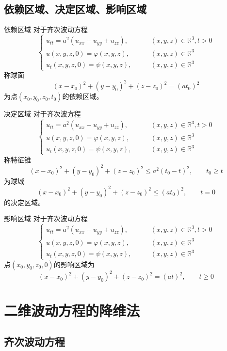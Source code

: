 \documentclass[lang = cn, scheme = chinese, thmcnt = section]{elegantbook}
\newcommand{\R}{\mathbb{R}}            %
\begin{document}
\subsection{依赖区域、决定区域、影响区域}

\begin{definition}{依赖区域}
	对于齐次波动方程
	$$
	\begin{cases}
		u_{tt}=a^2(u_{xx}+u_{yy}+u_{zz}),\qquad & (x,y,z)\in \R^3,t>0\\
		u(x,y,z,0)=\varphi(x,y,z),\qquad & (x,y,z)\in \R^3\\
		u_t(x,y,z,0)=\psi(x,y,z),\qquad & (x,y,z)\in \R^3
	\end{cases}
	$$
	称球面
	$$
	(x-x_0)^2+(y-y_0)^2+(z-z_0)^2=(at_0)^2
	$$
	为点$(x_0,y_0,z_0,t_0)$的依赖区域。
\end{definition}

\begin{definition}{决定区域}
	对于齐次波方程
	$$
	\begin{cases}
		u_{tt}=a^2(u_{xx}+u_{yy}+u_{zz}),\qquad & (x,y,z)\in \R^3,t>0\\
		u(x,y,z,0)=\varphi(x,y,z),\qquad & (x,y,z)\in \R^3\\
		u_t(x,y,z,0)=\psi(x,y,z),\qquad & (x,y,z)\in \R^3
	\end{cases}
	$$
	称特征锥
	$$
	(x-x_0)^2+(y-y_0)^2+(z-z_0)^2\le a^2(t_0-t)^2,\qquad t_0\ge t
	$$
	为球域
	$$
	(x-x_0)^2+(y-y_0)^2+(z-z_0)^2\le (at_0)^2,\qquad t=0
	$$
	的决定区域。
\end{definition}

\begin{definition}{影响区域}
	对于齐次波动方程
	$$
	\begin{cases}
		u_{tt}=a^2(u_{xx}+u_{yy}+u_{zz}),\qquad & (x,y,z)\in \R^3,t>0\\
		u(x,y,z,0)=\varphi(x,y,z),\qquad & (x,y,z)\in \R^3\\
		u_t(x,y,z,0)=\psi(x,y,z),\qquad & (x,y,z)\in \R^3
	\end{cases}
	$$
	点$(x_0,y_0,z_0,0)$的影响区域为%
	$$
	(x-x_0)^2+(y-y_0)^2+(z-z_0)^2=(at)^2,\qquad t\ge 0
	$$
\end{definition}

\section{二维波动方程的降维法}

\subsection{齐次波动方程}
\end{document}
